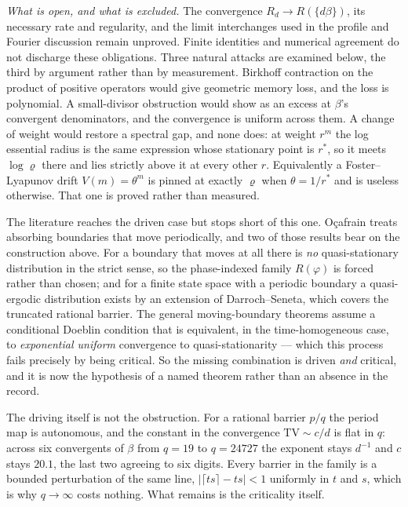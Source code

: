 \documentclass[11pt,a4paper]{article}
\begin{document}
\emph{What is open, and what is excluded.} The convergence
\(R_d\to R(\{d\beta\})\), its necessary rate and regularity, and the
limit interchanges used in the profile and Fourier discussion remain
unproved. Finite identities and numerical agreement do not discharge
these obligations. Three natural attacks are examined below, the third
by argument rather than by measurement. Birkhoff contraction on the
product of positive operators would give geometric memory loss, and the
loss is polynomial. A small-divisor obstruction would show as an excess
at \(\beta\)'s convergent denominators, and the convergence is uniform
across them. A change of weight would restore a spectral gap, and none
does: at weight \(r^m\) the log essential radius is the same expression
whose stationary point is \(r^{*}\), so it meets \(\log\varrho\) there
and lies strictly above it at every other \(r\). Equivalently a
Foster--Lyapunov drift \(V(m)=\theta^{m}\) is pinned at exactly
\(\varrho\) when \(\theta=1/r^{*}\) and is useless otherwise. That one
is proved rather than measured.

The literature reaches the driven case but stops short of this one.
O\c{c}afrain treats absorbing boundaries that move periodically, and two
of those results bear on the construction above. For a boundary that
moves at all there is \emph{no} quasi-stationary distribution in the
strict sense, so the phase-indexed family \(R(\varphi)\) is forced
rather than chosen; and for a finite state space with a periodic
boundary a quasi-ergodic distribution exists by an extension of
Darroch--Seneta, which covers the truncated rational barrier. The
general moving-boundary theorems assume a conditional Doeblin condition
that is equivalent, in the time-homogeneous case, to \emph{exponential
uniform} convergence to quasi-stationarity --- which this process fails
precisely by being critical. So the missing combination is driven
\emph{and} critical, and it is now the hypothesis of a named theorem
rather than an absence in the record.

The driving itself is not the obstruction. For a rational barrier
\(p/q\) the period map is autonomous, and the constant in the
convergence \(\mathrm{TV}\sim c/d\) is flat in \(q\): across six
convergents of \(\beta\) from \(q=19\) to \(q=24727\) the exponent stays
\(d^{-1}\) and \(c\) stays \(20.1\), the last two agreeing to six
digits. Every barrier in the family is a bounded perturbation of the
same line, \(\lvert\lceil ts\rceil-ts\rvert<1\) uniformly in \(t\) and
\(s\), which is why \(q\to\infty\) costs nothing. What remains is the
criticality itself.
\end{document}
